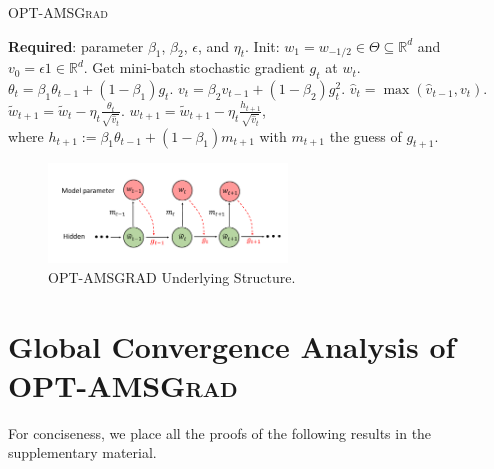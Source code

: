\documentclass[11pt]{article}
\theoremstyle{k}
\begin{document}
\vspace{-0.15in}
\begin{minipage}{0.54\linewidth}
\begin{algorithm}[H]
\begin{algorithmic}[1] 
\small
\caption{\textsc{OPT-AMSGrad}} \label{alg:optamsgrad}
\STATE \textbf{Required}: parameter $\beta_1$, $\beta_2$, $\epsilon$, and $\eta_t$. 
\STATE Init: $w_1 = w_{-1/2} \in \Theta \subseteq \mathbb R^d $ and $v_{0} = \epsilon 1 \in \mathbb R^{d}$.
\STATE Get mini-batch stochastic gradient $g_t$ at $w_t$.
\STATE $\theta_t = \beta_{1} \theta_{t-1} + (1 - \beta_{1}) g_t$.
\STATE $v_t = \beta_2 v_{t-1} + (1 - \beta_2) g_t^{2}$.
\STATE $\hat{v}_t = \max( \hat{v}_{t-1} , v_t )$. 
\STATE $\tilde{w}_{t+1} =  \tilde{w}_{t} - \eta_t \frac{\theta_t}{ \sqrt{\hat{v}_t }  } $.
\STATE $w_{t+1} = \tilde{w}_{t+1} - \eta_{t} \frac{h_{t+1}}{ \sqrt{\hat{v}_t } } $,  \\  
where $h_{t+1}:= \beta_{1} \theta_{t-1} + (1 - \beta_{1}) m_{t+1}$ with $m_{t+1}$ the guess of $g_{t+1}$. 
\ENDFOR 
\end{algorithmic}
\end{algorithm}
\end{minipage}
\hfill
\begin{minipage}{0.46\linewidth}
\begin{figure}[H]
\captionsetup{justification=centering}
    \hspace{-0.15in}
    \includegraphics[width=2.5in]{plot.pdf}
    \caption{\textsc{OPT-AMSGRAD} Underlying Structure.}
     \label{fig:scheme}
\end{figure}
\end{minipage}
\vspace{-0.1in}
\section{Global Convergence Analysis of \textsc{OPT-AMSGrad}}\label{sec:analysis}
For conciseness, we place all the proofs of the following results in the supplementary material.\vspace{-0.05in}
\end{document}
